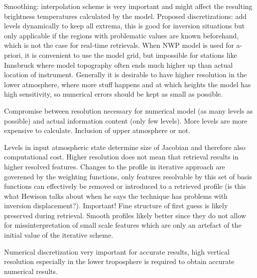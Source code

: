     \stopsubsection

    \startsubsection[title=Discretization and Interpolation]

        Smoothing: interpolation scheme is very important and might affect the
        resulting brightness temperatures calculated by the model. Proposed
        discretizations: add levels dynamically to keep all extrema, this is
        good for inversion situations but only applicable if the regions with
        problematic values are known beforehand, which is not the case for
        real-time retrievals. When NWP model is used for a-priori, it is
        convenient to use the model grid, but impossible for stations like
        Innsbruck where model topography often ends much higher up than
        actual location of instrument. Generally it is desirable to have higher
        resolution in the lower atmosphere, where more stuff happens and
        at which heights the model has high sensitivity, so numerical errors
        should be kept as small as possible.

        Compromise between resolution necessary for numerical model (as many
        levels as possible) and actual information content (only few levels).
        More levels are more expensive to calculate. Inclusion of upper
        atmosphere or not.

        Levels in input atmospheric state determine size of Jacobian and
        therefore also computational cost. Higher resolution does not mean
        that retrieval results in higher resolved features. Changes to the
        profile in iterative approach are goverened by the weighting functions,
        only features resolvable by this set of basis functions can effectively
        be removed or introduced to a retrieved profile (is this what Hewison
        talks about when he says the technique has problems with inversion
        displacement?). Important! Fine structure of first guess is likely
        preserved during retrieval. Smooth profiles likely better since they
        do not allow for missinterpretation of small scale features which are
        only an artefact of the initial value of the iterative scheme.

        Numerical discretization very important for accurate results, high
        vertical resolution especially in the lower troposphere is required to
        obtain accurate numerical results.

    \stopsubsection

    \startsubsection[title=Fast Absorption Prediction]

